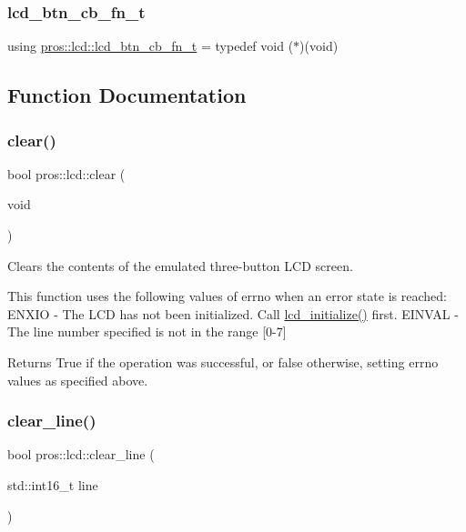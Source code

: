 \subsubsection{\texorpdfstring{lcd\_btn\_cb\_fn\_t}{lcd\_btn\_cb\_fn\_t}}
{\footnotesize\ttfamily using \mbox{\hyperlink{namespacepros_1_1lcd_ab5c0cdcf37795ff2a9dcaf546b087dd4}{pros\+::lcd\+::lcd\+\_\+btn\+\_\+cb\+\_\+fn\+\_\+t}} = typedef void ($\ast$)(void)}



\subsection{Function Documentation}
\mbox{\label{namespacepros_1_1lcd_a8d22379bd680a36182d51d8e8ef02baf}} 
\subsubsection{\texorpdfstring{clear()}{clear()}}
{\footnotesize\ttfamily bool pros\+::lcd\+::clear (\begin{DoxyParamCaption}\item[{void}]{ }\end{DoxyParamCaption})}



Clears the contents of the emulated three-\/button L\+CD screen. 

This function uses the following values of errno when an error state is reached\+: E\+N\+X\+IO -\/ The L\+CD has not been initialized. Call \mbox{\hyperlink{llemu_8h_ae618494f080e95b506c0c18cb1ffb407}{lcd\+\_\+initialize()}} first. E\+I\+N\+V\+AL -\/ The line number specified is not in the range \mbox{[}0-\/7\mbox{]}

\begin{DoxyReturn}{Returns}
True if the operation was successful, or false otherwise, setting errno values as specified above. 
\end{DoxyReturn}
\mbox{\label{namespacepros_1_1lcd_aef44947cea9006f86d4aaa2e32856835}} 
\subsubsection{\texorpdfstring{clear\_line()}{clear\_line()}}
{\footnotesize\ttfamily bool pros\+::lcd\+::clear\+\_\+line (\begin{DoxyParamCaption}\item[{std\+::int16\+\_\+t}]{line }\end{DoxyParamCaption})}



